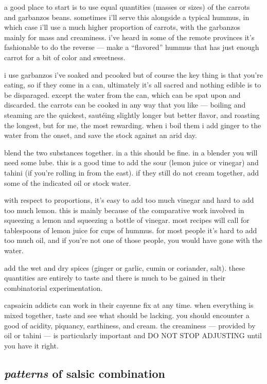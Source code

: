 a good place to start is to use equal quantities (masses or sizes) of
the carrots and garbanzos beans. sometimes i'll serve this alongside a
typical hummus, in which case i'll use a much higher proportion of
carrots, with the garbanzos mainly for mass and creaminess. i've heard
in some of the remote provinces it's fashionable to do the reverse ---
make a ``flavored'' hummus that has just enough carrot for a bit of
color and sweetness.

i use garbanzos i've soaked and pcooked but of course the key thing is
that you're eating, so if they come in a can, ultimately it's all
sacred and nothing edible is to be disparaged. except the water from
the can, which can be spat upon and discarded. the carrots can be
cooked in any way that you like --- boiling and steaming are the
quickest, saut\'{e}ing slightly longer but better flavor, and roasting
the longest, but for me, the most rewarding. when i boil them i add
ginger to the water from the onset, and save the stock against an arid
day.

blend the two substances together. in a  this should be fine. in
a blender you will need some lube. this is a good time to add the sour
(lemon juice or vinegar) and tahini (if you're rolling in from the
east). if they still do not cream together, add some of the indicated
oil or stock water.

with respect to proportions, it's easy to add too much vinegar and
hard to add too much lemon. this is mainly because of the comparative
work involved in squeezing a lemon and squeezing a bottle of
vinegar. most recipes will call for  tablespoons of lemon juice
for  cups of hummus. for most people it's hard to add too much
oil, and if you're not one of those people, you would have gone with
the water.

add the wet and dry spices (ginger or garlic, cumin or coriander,
salt). these quantities are entirely to taste and there is much to be
gained in their combinatorial experimentation.

capsaicin addicts can work in their cayenne fix at any time. when
everything is mixed together, taste and see what should be
lacking. you should encounter a good  of acidity, piquancy,
earthiness, and cream. the creaminess --- provided by oil or tahini
--- is particularly important and DO NOT STOP ADJUSTING until you have
it right.

\subsection{\textit{patterns} of salsic combination}

